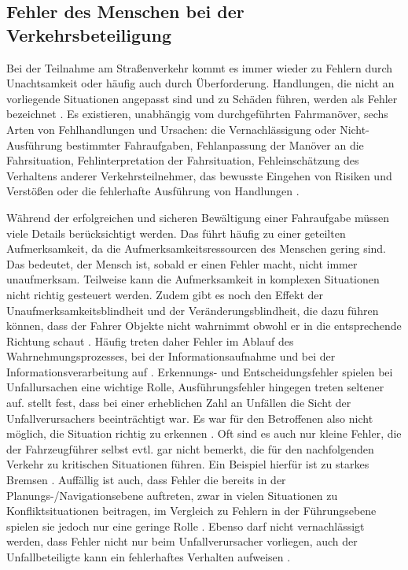 \subsection{Fehler des Menschen bei der Verkehrsbeteiligung}\label{Fehler des Menschen bei der Verkehrsbeteiligung}
Bei der Teilnahme am Straßenverkehr kommt es immer wieder zu Fehlern durch Unachtsamkeit oder häufig auch durch Überforderung. Handlungen, die nicht an vorliegende Situationen angepasst sind und zu Schäden führen, werden als Fehler bezeichnet \parencite[S. 17]{Gerstenberger.17.02.2015}. Es existieren, unabhängig vom durchgeführten Fahrmanöver, sechs Arten von Fehlhandlungen und Ursachen: die Vernachlässigung oder Nicht-Ausführung bestimmter Fahraufgaben, Fehlanpassung der Manöver an die Fahrsituation, Fehlinterpretation der Fahrsituation, Fehleinschätzung des Verhaltens anderer Verkehrsteilnehmer,  das bewusste Eingehen von Risiken und Verstößen oder die fehlerhafte Ausführung von Handlungen \parencite[S. 32f]{Vollrath.2006}. %

Während der erfolgreichen und sicheren Bewältigung einer Fahraufgabe müssen viele Details berücksichtigt werden. Das führt häufig zu einer geteilten Aufmerksamkeit, da die Aufmerksamkeitsressourcen des Menschen gering sind. Das bedeutet, der Mensch ist, sobald er einen Fehler macht, nicht immer unaufmerksam. Teilweise kann die Aufmerksamkeit in komplexen Situationen nicht richtig gesteuert werden. Zudem gibt es noch den Effekt der Unaufmerksamkeitsblindheit und der Veränderungsblindheit, die dazu führen können, dass der Fahrer Objekte nicht wahrnimmt obwohl er in die entsprechende Richtung schaut \parencite[S. 31-33]{Gerstenberger.17.02.2015}. Häufig treten daher Fehler im Ablauf des Wahrnehmungsprozesses, bei der Informationsaufnahme und bei der Informationsverarbeitung auf \parencite[S. 47]{DEKRA.2017}. Erkennungs- und Entscheidungsfehler spielen bei Unfallursachen eine wichtige Rolle, Ausführungsfehler hingegen treten seltener auf. \Textcite [S. 152]{Grundl.2005} stellt fest, dass bei einer erheblichen Zahl an Unfällen die Sicht der Unfallverursachers beeinträchtigt war. Es war für den Betroffenen also nicht möglich, die Situation richtig zu erkennen \parencite[S. 152]{Grundl.2005}. Oft sind es auch nur kleine Fehler, die der Fahrzeugführer selbst evtl. gar nicht bemerkt, die für den nachfolgenden Verkehr zu kritischen Situationen führen. Ein Beispiel hierfür ist zu starkes Bremsen \parencite[S. 1]{Hoffmann.26.04.2013}. Auffällig ist auch, dass Fehler die bereits in der Planungs-/Navigationsebene auftreten, zwar in vielen Situationen zu Konfliktsituationen beitragen, im Vergleich zu Fehlern in der Führungsebene spielen sie jedoch nur eine geringe Rolle \parencite[S. 39f]{Reichart.2001}. Ebenso darf nicht vernachlässigt werden, dass Fehler nicht nur beim Unfallverursacher vorliegen, auch der Unfallbeteiligte kann ein fehlerhaftes Verhalten aufweisen \parencite[S. 107]{Grundl.2005}.

